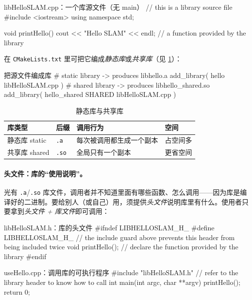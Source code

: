 \begin{codebox}[C++]{libHelloSLAM.cpp：一个库源文件（无 main）}
// this is a library source file
#include <iostream>
using namespace std;

void printHello() {
    cout << "Hello SLAM" << endl;   // a function provided by the library
}
\end{codebox}

\noindent 在 \texttt{CMakeLists.txt} 里可把它编成\emph{静态库}或\emph{共享库}（见 \cref{tab:intro-libtype}）：

\begin{codebox}[text]{把源文件编成库}
# static library -> produces libhello.a
add_library( hello libHelloSLAM.cpp )
# shared library -> produces libhello_shared.so
add_library( hello_shared SHARED libHelloSLAM.cpp )
\end{codebox}

\begin{table}[H]\centering\small
\caption{静态库与共享库}
\label{tab:intro-libtype}
\begin{tabular}{p{} p{} p{} p{}}
\toprule
库类型 & 后缀 & 调用行为 & 空间 \\
\midrule
静态库 static & \texttt{.a} & 每次被调用都生成一个副本 & 占空间多 \\
共享库 shared & \texttt{.so} & 全局只有一个副本 & 更省空间 \\
\bottomrule
\end{tabular}
\end{table}

\paragraph{头文件：库的“使用说明”。}
光有 \texttt{.a}/\texttt{.so} 库文件，调用者并不知道里面有哪些函数、怎么调用——因为库是编译好的二进制。要给别人（或自己）用，须提供\emph{头文件}说明库里有什么。使用者只要拿到\emph{头文件 + 库文件}即可调用：

\begin{codebox}[C++]{libHelloSLAM.h：库的头文件}
#ifndef LIBHELLOSLAM_H_
#define LIBHELLOSLAM_H_
// the include guard above prevents this header from being included twice
void printHello();   // declare the function provided by the library
#endif
\end{codebox}

\begin{codebox}[C++]{useHello.cpp：调用库的可执行程序}
#include "libHelloSLAM.h"   // refer to the library header to know how to call
int main(int argc, char **argv) {
    printHello();
    return 0;
}
\end{codebox}

